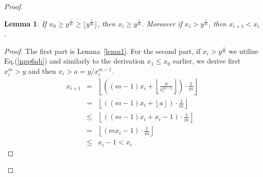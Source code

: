 \documentclass[11pt]{article}
\newtheorem{lem}{Lemma}
\newcommand{\floor}[1]{\lfloor #1 \rfloor}
\begin{document}
\begin{proof}
\begin{lem}
\label{lemn2}
If $x_0 \geq y^{\frac{1}{m}} \geq
\floor{ y^{\frac{1}{m}} }$,
then $x_i \geq  y^{\frac{1}{m}} $.
Moreover if
$x_i  >    y^{\frac{1}{m}} $,
then $x_{i+1} < x_i$.
\end{lem}
\begin{proof}
The first part is Lemma~\ref{lemn1}.
For the second part, if $x_i >  y^{\frac{1}{m}} $ we
utilize Eq.(\ref{npp6ab}) and similarly to the derivation
$x_1 \leq x_0$ earlier, we derive first $ x_i^m > y $
and then $x_i > a= y / x_i^{m-1}$.
\begin{eqnarray}
\label{npp6d}
x_{i+1}
&=&
  \left\lfloor
     \left( (m-1) x_i +   \left\lfloor
                          \frac{y}{x_i^{m-1}}
                          \right\rfloor
     \right) \cdot  \frac{1}{m}
  \right\rfloor  \nonumber \\
&=&
  \left\lfloor
     \left( (m-1) x_i +   \left\lfloor
                          a
                          \right\rfloor
     \right) \cdot  \frac{1}{m}
  \right\rfloor  \nonumber \\
&\leq&
  \left\lfloor
     \left( (m-1) x_i +  
                          x_i -1
     \right) \cdot  \frac{1}{m}
  \right\rfloor  \nonumber \\
&=&
\label{npp6e}
  \left\lfloor
     \left( m x_i - 1 
     \right) \cdot  \frac{1}{m}
  \right\rfloor \nonumber \\
&\leq& x_{i}-1 < x_i
\end{eqnarray}
\end{proof}


\end{proof}
\end{document}
